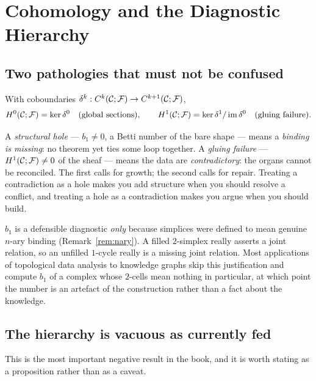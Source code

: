 \chapter{Cohomology and the Diagnostic Hierarchy}\label{ch:cohomology}

\section{Two pathologies that must not be confused}

\begin{definition}\label{def:cohom}
With coboundaries $\delta^k:C^{k}(\mathcal{C};\mathcal{F})\to C^{k+1}(\mathcal{C};\mathcal{F})$,
\[
  H^{0}(\mathcal{C};\mathcal{F})=\ker\delta^0\quad(\text{global sections}),
  \qquad
  H^{1}(\mathcal{C};\mathcal{F})=\ker\delta^1/\operatorname{im}\delta^0\quad(\text{gluing failure}).
\]
\end{definition}

\begin{intu}\Intu
A \emph{structural hole} --- $b_1\neq0$, a Betti number of the bare
shape --- means a \emph{binding is missing}: no theorem yet ties some
loop together. A \emph{gluing failure} --- $H^{1}(\mathcal{C};\mathcal{F})\neq0$ of the sheaf ---
means the data are \emph{contradictory}: the organs cannot be
reconciled. The first calls for growth; the second calls for repair.
Treating a contradiction as a hole makes you add structure when you
should resolve a conflict, and treating a hole as a contradiction makes
you argue when you should build.
\end{intu}

\begin{remark}\label{rem:b1earned}
$b_1$ is a defensible diagnostic \emph{only} because simplices were
defined to mean genuine $n$-ary binding
(Remark~\ref{rem:nary}). A filled $2$-simplex really asserts a joint
relation, so an unfilled $1$-cycle really is a missing joint relation.
Most applications of topological data analysis to knowledge graphs skip
this justification and compute $b_1$ of a complex whose $2$-cells mean
nothing in particular, at which point the number is an artefact of the
construction rather than a fact about the knowledge.
\end{remark}

\section{The hierarchy is vacuous as currently fed}

This is the most important negative result in the book, and it is worth
stating as a proposition rather than as a caveat.

